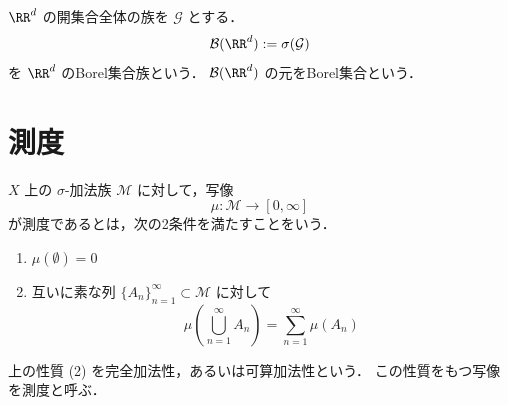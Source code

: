 \begin{definition}[Borel集合族]
$\RR^d$ の開集合全体の族を $\mathcal G$ とする．
\[
\mathcal B(\RR^d):=\sigma(\mathcal G)
\]
を $\RR^d$ のBorel集合族という．
$\mathcal B(\RR^d)$ の元をBorel集合という．
\end{definition}

\section{測度}

\begin{definition}[測度]
$X$ 上の $\sigma$-加法族 $\mathcal M$ に対して，写像
\[
\mu:\mathcal M \to [0,\infty]
\]
が測度であるとは，次の2条件を満たすことをいう．
\begin{enumerate}
    \item $\mu(\emptyset)=0$
    \item 互いに素な列 $\{A_n\}_{n=1}^{\infty}\subset \mathcal M$ に対して
    \[
    \mu\left(\bigcup_{n=1}^{\infty}A_n\right)
    =
    \sum_{n=1}^{\infty}\mu(A_n)
    \]
\end{enumerate}
\end{definition}

\begin{remark}
上の性質 (2) を完全加法性，あるいは可算加法性という．
この性質をもつ写像を測度と呼ぶ．
\end{remark}

